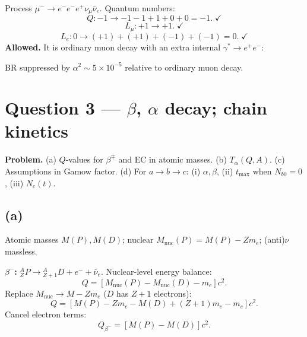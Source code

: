 \documentclass[11pt]{article}
\begin{document}
Process $\mu^-\to e^-e^-e^+\nu_\mu\bar\nu_e$. Quantum numbers:
\[ Q: -1 \to -1-1+1+0+0 = -1.\;\checkmark \]
\[ L_\mu: +1 \to +1.\;\checkmark \]
\[ L_e: 0 \to (+1)+(+1)+(-1)+(-1) = 0.\;\checkmark \]
\textbf{Allowed.} It is ordinary muon decay with an extra internal $\gamma^*\to e^+e^-$:

\begin{center}
\end{center}

BR suppressed by $\alpha^2 \sim 5\times 10^{-5}$ relative to ordinary muon decay.

\section*{Question 3 --- $\beta$, $\alpha$ decay; chain kinetics}

\textbf{Problem.} (a) $Q$-values for $\beta^\mp$ and EC in atomic masses. (b) $T_\alpha(Q,A)$. (c) Assumptions in Gamow factor. (d) For $a\to b\to c$: (i) $\alpha,\beta$, (ii) $t_{\max}$ when $N_{b0}=0$, (iii) $N_c(t)$.

\subsection*{(a)}

Atomic masses $M(P), M(D)$; nuclear $M_{\text{nuc}}(P) = M(P) - Z m_e$; (anti)$\nu$ massless.

\textbf{$\beta^-$:} ${}^A_Z P\to {}^A_{Z+1} D + e^-+\bar\nu_e$. Nuclear-level energy balance:
\[ Q = [M_{\text{nuc}}(P) - M_{\text{nuc}}(D) - m_e]c^2. \]
Replace $M_{\text{nuc}} \to M - Z m_e$ ($D$ has $Z+1$ electrons):
\[ Q = [M(P) - Z m_e - M(D) + (Z+1)m_e - m_e]c^2. \]
Cancel electron terms:
\[ \boxed{\;Q_{\beta^-} = [M(P) - M(D)]c^2.\;} \]
\end{document}
